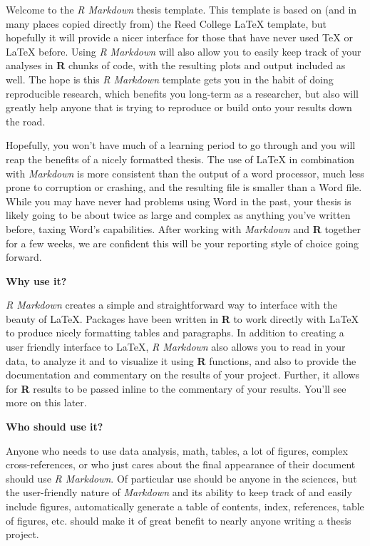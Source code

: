 Welcome to the \emph{R Markdown} thesis template. This template is based on (and in many places copied directly from) the Reed College LaTeX template, but hopefully it will provide a nicer interface for those that have never used TeX or LaTeX before. Using \emph{R Markdown} will also allow you to easily keep track of your analyses in \textbf{R} chunks of code, with the resulting plots and output included as well. The hope is this \emph{R Markdown} template gets you in the habit of doing reproducible research, which benefits you long-term as a researcher, but also will greatly help anyone that is trying to reproduce or build onto your results down the road.

Hopefully, you won't have much of a learning period to go through and you will reap the benefits of a nicely formatted thesis. The use of LaTeX in combination with \emph{Markdown} is more consistent than the output of a word processor, much less prone to corruption or crashing, and the resulting file is smaller than a Word file. While you may have never had problems using Word in the past, your thesis is likely going to be about twice as large and complex as anything you've written before, taxing Word's capabilities. After working with \emph{Markdown} and \textbf{R} together for a few weeks, we are confident this will be your reporting style of choice going forward.

\textbf{Why use it?}

\emph{R Markdown} creates a simple and straightforward way to interface with the beauty of LaTeX. Packages have been written in \textbf{R} to work directly with LaTeX to produce nicely formatting tables and paragraphs. In addition to creating a user friendly interface to LaTeX, \emph{R Markdown} also allows you to read in your data, to analyze it and to visualize it using \textbf{R} functions, and also to provide the documentation and commentary on the results of your project. Further, it allows for \textbf{R} results to be passed inline to the commentary of your results. You'll see more on this later.

\textbf{Who should use it?}

Anyone who needs to use data analysis, math, tables, a lot of figures, complex cross-references, or who just cares about the final appearance of their document should use \emph{R Markdown}. Of particular use should be anyone in the sciences, but the user-friendly nature of \emph{Markdown} and its ability to keep track of and easily include figures, automatically generate a table of contents, index, references, table of figures, etc. should make it of great benefit to nearly anyone writing a thesis project.

